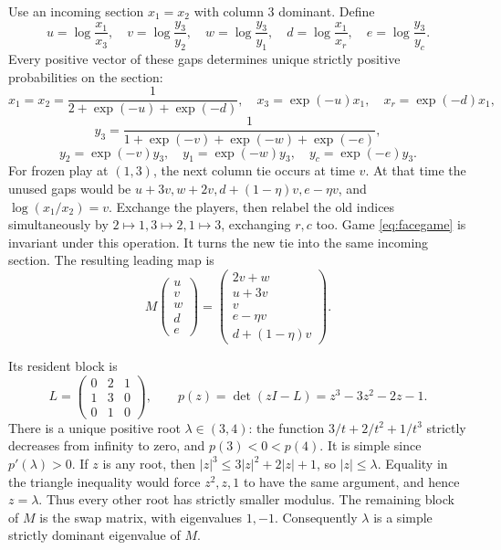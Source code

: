 \documentclass[11pt,a4paper]{article}
\numberwithin{equation}{section}
\theoremstyle{definition}
\begin{document}
Use an incoming section \(x_1=x_2\) with column 3 dominant. Define
\begin{equation}\label{eq:gaps}
 u=\log\frac{x_1}{x_3},\quad
 v=\log\frac{y_3}{y_2},\quad
 w=\log\frac{y_3}{y_1},\quad
 d=\log\frac{x_1}{x_r},\quad
 e=\log\frac{y_3}{y_c}.
\end{equation}
Every positive vector of these gaps determines unique strictly
positive probabilities on the section:
\[
 x_1=x_2=\frac1{2+\exp(-u)+\exp(-d)},\quad
 x_3=\exp(-u)x_1,\quad x_r=\exp(-d)x_1,
\]
\[
 y_3=\frac1{1+\exp(-v)+\exp(-w)+\exp(-e)},
\]
\[
 y_2=\exp(-v)y_3,\quad y_1=\exp(-w)y_3,\quad y_c=\exp(-e)y_3.
\]
For frozen play at \((1,3)\), the next column tie occurs at time
\(v\). At that time the unused gaps would be
\(u+3v,w+2v,d+(1-\eta)v,e-\eta v\), and
\(\log(x_1/x_2)=v\).
Exchange the players, then relabel the old indices simultaneously by
\(2\mapsto1,3\mapsto2,1\mapsto3\), exchanging \(r,c\) too.
Game \eqref{eq:facegame} is invariant under this operation. It turns
the new tie into the same incoming section. The resulting leading map is
\begin{equation}\label{eq:M}
 M\begin{pmatrix}u\\v\\w\\d\\e\end{pmatrix}
 =\begin{pmatrix}
 2v+w\\u+3v\\v\\e-\eta v\\d+(1-\eta)v
 \end{pmatrix}.
\end{equation}

Its resident block is
\[
 L=\begin{pmatrix}0&2&1\\1&3&0\\0&1&0\end{pmatrix},
 \qquad p(z)=\det(zI-L)=z^3-3z^2-2z-1.
\]
There is a unique positive root \(\lambda\in(3,4)\): the function
\(3/t+2/t^2+1/t^3\) strictly decreases from infinity to zero, and
\(p(3)<0<p(4)\). It is simple since \(p'(\lambda)>0\).
If \(z\) is any root, then
\(|z|^3\le3|z|^2+2|z|+1\), so \(|z|\le\lambda\).
Equality in the triangle inequality would force \(z^2,z,1\) to
have the same argument, and hence \(z=\lambda\). Thus every other
root has strictly smaller modulus. The remaining block of \(M\)
is the swap matrix, with eigenvalues \(1,-1\). Consequently
\(\lambda\) is a simple strictly dominant eigenvalue of \(M\).
\end{document}

